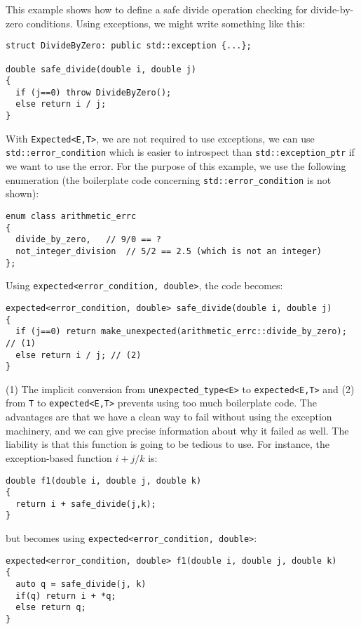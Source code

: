 \documentclass[a4paper,10pt]{article}
\newcommand{\cpp}[1]{\lstinline{#1}}
\begin{document}
This example shows how to define a safe divide operation checking for divide-by-zero conditions. Using exceptions, we might write something like this:

\begin{lstlisting}
struct DivideByZero: public std::exception {...};

double safe_divide(double i, double j)
{
  if (j==0) throw DivideByZero();
  else return i / j;
}
\end{lstlisting}

With \cpp{Expected<E,T>}, we are not required to use exceptions, we can use \cpp{std::error_condition} which is easier to introspect than \cpp{std::exception_ptr} if we want to use the error. For the purpose of this example, we use the following enumeration (the boilerplate code concerning \cpp{std::error_condition} is not shown):

\begin{lstlisting}
enum class arithmetic_errc
{
  divide_by_zero,   // 9/0 == ?
  not_integer_division  // 5/2 == 2.5 (which is not an integer)
};
\end{lstlisting}

\noindent
Using \cpp{expected<error_condition, double>}, the code becomes:

\begin{lstlisting}
expected<error_condition, double> safe_divide(double i, double j)
{
  if (j==0) return make_unexpected(arithmetic_errc::divide_by_zero); // (1)
  else return i / j; // (2)
}
\end{lstlisting}

(1) The implicit conversion from \cpp{unexpected_type<E>} to \cpp{expected<E,T>} and (2) from \cpp{T} to \cpp{expected<E,T>} prevents using too much boilerplate code. The advantages are that we have a clean way to fail without using the exception machinery, and we can give precise information about why it failed as well. The liability is that this function is going to be tedious to use. For instance, the exception-based function $i + j/k$ is:

\begin{lstlisting}
double f1(double i, double j, double k)
{
  return i + safe_divide(j,k);
}
\end{lstlisting}

\noindent
but becomes using \texttt{expected<error_condition, double>}:

\begin{lstlisting}
expected<error_condition, double> f1(double i, double j, double k)
{
  auto q = safe_divide(j, k)
  if(q) return i + *q;
  else return q;
}
\end{lstlisting}
\end{document}
